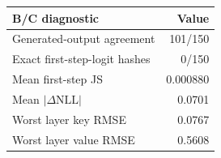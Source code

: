 \begin{tabular}{lr}
\toprule
B/C diagnostic & Value \\
\midrule
Generated-output agreement & 101/150 \\
Exact first-step-logit hashes & 0/150 \\
Mean first-step JS & 0.000880 \\
Mean $|\Delta\mathrm{NLL}|$ & 0.0701 \\
Worst layer key RMSE & 0.0767 \\
Worst layer value RMSE & 0.5608 \\
\bottomrule
\end{tabular}

